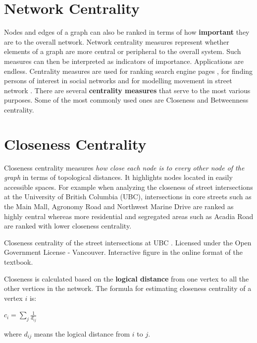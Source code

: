 \documentclass[
]{book}
\begin{document}
\hypertarget{network-centrality}{%
\section{Network Centrality}\label{network-centrality}}

Nodes and edges of a graph can also be ranked in terms of how \textbf{important} they are to the overall network. Network centrality measures represent whether elements of a graph are more central or peripheral to the overall system. Such measures can then be interpreted as indicators of importance. Applications are endless. Centrality measures are used for ranking search engine pages \citep{wikimedia_pagerank_2021}, for finding persons of interest in social networks \citep{ajorlou_introduction_2018} and for modelling movement in street network \citep{hillier_natural_1993}. There are several \textbf{centrality measures} that serve to the most various purposes. Some of the most commonly used ones are Closeness and Betweenness centrality.

\hypertarget{closeness-centrality}{%
\section{Closeness Centrality}\label{closeness-centrality}}

Closeness centrality measures \emph{how close each node is to every other node of the graph} in terms of topological distances. It highlights nodes located in easily accessible spaces. For example when analyzing the closeness of street intersections at the University of British Columbia (UBC), intersections in core streets such as the Main Mall, Agronomy Road and Northwest Marine Drive are ranked as highly central whereas more residential and segregated areas such as Acadia Road are ranked with lower closeness centrality.

\label{fig:8-closeness-centrality-UBC}Closeness centrality of the street intersections at UBC \citep{city_of_vancouver_open_nodate}. Licensed under the Open Government License - Vancouver. Interactive figure in the online format of the textbook.

Closeness is calculated based on the \textbf{logical distance} from one vertex to all the other vertices in the network. The formula for estimating closeness centrality of a vertex \(i\) is:

\(c_i = \sum\limits_{j} \frac{1}{d_{ij}}\)

where \(d_{ij}\) means the logical distance from \(i\) to \(j\).
\end{document}
